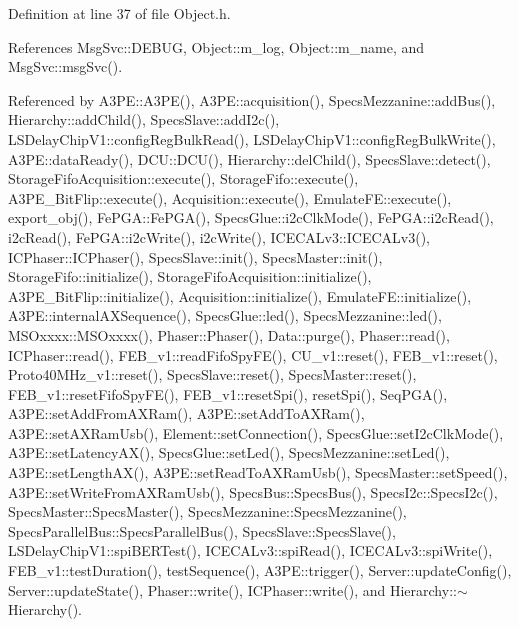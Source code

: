 Definition at line 37 of file Object.\+h.



References Msg\+Svc\+::\+D\+E\+B\+UG, Object\+::m\+\_\+log, Object\+::m\+\_\+name, and Msg\+Svc\+::msg\+Svc().



Referenced by A3\+P\+E\+::\+A3\+P\+E(), A3\+P\+E\+::acquisition(), Specs\+Mezzanine\+::add\+Bus(), Hierarchy\+::add\+Child(), Specs\+Slave\+::add\+I2c(), L\+S\+Delay\+Chip\+V1\+::config\+Reg\+Bulk\+Read(), L\+S\+Delay\+Chip\+V1\+::config\+Reg\+Bulk\+Write(), A3\+P\+E\+::data\+Ready(), D\+C\+U\+::\+D\+C\+U(), Hierarchy\+::del\+Child(), Specs\+Slave\+::detect(), Storage\+Fifo\+Acquisition\+::execute(), Storage\+Fifo\+::execute(), A3\+P\+E\+\_\+\+Bit\+Flip\+::execute(), Acquisition\+::execute(), Emulate\+F\+E\+::execute(), export\+\_\+obj(), Fe\+P\+G\+A\+::\+Fe\+P\+G\+A(), Specs\+Glue\+::i2c\+Clk\+Mode(), Fe\+P\+G\+A\+::i2c\+Read(), i2c\+Read(), Fe\+P\+G\+A\+::i2c\+Write(), i2c\+Write(), I\+C\+E\+C\+A\+Lv3\+::\+I\+C\+E\+C\+A\+Lv3(), I\+C\+Phaser\+::\+I\+C\+Phaser(), Specs\+Slave\+::init(), Specs\+Master\+::init(), Storage\+Fifo\+::initialize(), Storage\+Fifo\+Acquisition\+::initialize(), A3\+P\+E\+\_\+\+Bit\+Flip\+::initialize(), Acquisition\+::initialize(), Emulate\+F\+E\+::initialize(), A3\+P\+E\+::internal\+A\+X\+Sequence(), Specs\+Glue\+::led(), Specs\+Mezzanine\+::led(), M\+S\+Oxxxx\+::\+M\+S\+Oxxxx(), Phaser\+::\+Phaser(), Data\+::purge(), Phaser\+::read(), I\+C\+Phaser\+::read(), F\+E\+B\+\_\+v1\+::read\+Fifo\+Spy\+F\+E(), C\+U\+\_\+v1\+::reset(), F\+E\+B\+\_\+v1\+::reset(), Proto40\+M\+Hz\+\_\+v1\+::reset(), Specs\+Slave\+::reset(), Specs\+Master\+::reset(), F\+E\+B\+\_\+v1\+::reset\+Fifo\+Spy\+F\+E(), F\+E\+B\+\_\+v1\+::reset\+Spi(), reset\+Spi(), Seq\+P\+G\+A(), A3\+P\+E\+::set\+Add\+From\+A\+X\+Ram(), A3\+P\+E\+::set\+Add\+To\+A\+X\+Ram(), A3\+P\+E\+::set\+A\+X\+Ram\+Usb(), Element\+::set\+Connection(), Specs\+Glue\+::set\+I2c\+Clk\+Mode(), A3\+P\+E\+::set\+Latency\+A\+X(), Specs\+Glue\+::set\+Led(), Specs\+Mezzanine\+::set\+Led(), A3\+P\+E\+::set\+Length\+A\+X(), A3\+P\+E\+::set\+Read\+To\+A\+X\+Ram\+Usb(), Specs\+Master\+::set\+Speed(), A3\+P\+E\+::set\+Write\+From\+A\+X\+Ram\+Usb(), Specs\+Bus\+::\+Specs\+Bus(), Specs\+I2c\+::\+Specs\+I2c(), Specs\+Master\+::\+Specs\+Master(), Specs\+Mezzanine\+::\+Specs\+Mezzanine(), Specs\+Parallel\+Bus\+::\+Specs\+Parallel\+Bus(), Specs\+Slave\+::\+Specs\+Slave(), L\+S\+Delay\+Chip\+V1\+::spi\+B\+E\+R\+Test(), I\+C\+E\+C\+A\+Lv3\+::spi\+Read(), I\+C\+E\+C\+A\+Lv3\+::spi\+Write(), F\+E\+B\+\_\+v1\+::test\+Duration(), test\+Sequence(), A3\+P\+E\+::trigger(), Server\+::update\+Config(), Server\+::update\+State(), Phaser\+::write(), I\+C\+Phaser\+::write(), and Hierarchy\+::$\sim$\+Hierarchy().


